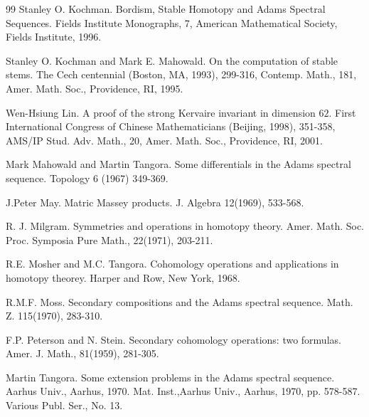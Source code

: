 \documentclass[psamsfonts]{amsart}
\theoremstyle{definition}
\numberwithin{equation}{section}
\begin{document}
\begin{thebibliography}{99}
Stanley O. Kochman.
Bordism, Stable Homotopy and Adams Spectral Sequences.
Fields Institute Monographs, 7, American Mathematical Society, Fields Institute, 1996.

Stanley O. Kochman and Mark E. Mahowald.
On the computation of stable stems.
The Cech centennial (Boston, MA, 1993), 299-316, Contemp. Math., 181, Amer. Math. Soc., Providence, RI, 1995.

Wen-Hsiung Lin.
A proof of the strong Kervaire invariant in dimension $62$.
First International Congress of Chinese Mathematicians (Beijing, 1998), 351-358,
AMS/IP Stud. Adv. Math., 20, Amer. Math. Soc., Providence, RI, 2001.

Mark Mahowald and Martin Tangora.
Some differentials in the Adams spectral sequence.
Topology 6 (1967) 349-369.

J.Peter May.
Matric Massey products.
J. Algebra 12(1969), 533-568.

R. J. Milgram.
Symmetries and operations in homotopy theory.
Amer. Math. Soc. Proc. Symposia Pure Math., 22(1971), 203-211.

R.E. Mosher and M.C. Tangora.
Cohomology operations and applications in homotopy theorey.
Harper and Row, New York, 1968.

R.M.F. Moss.
Secondary compositions and the Adams spectral sequence.
Math. Z. 115(1970), 283-310.

F.P. Peterson and N. Stein.
Secondary cohomology operations: two formulas.
Amer. J. Math., 81(1959), 281-305.

Martin Tangora.
Some extension problems in the Adams spectral sequence.
Aarhus Univ., Aarhus, 1970. Mat. Inst.,Aarhus Univ., Aarhus, 1970, pp. 578-587. Various Publ. Ser., No. 13.

\end{thebibliography}
\end{document}
